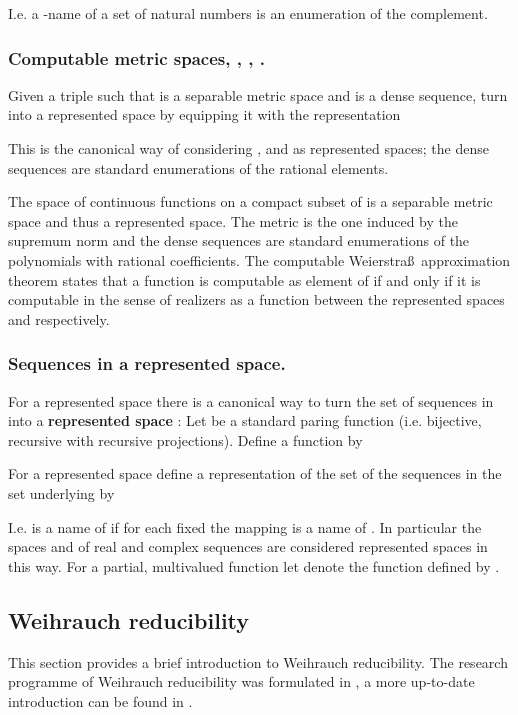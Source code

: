 \documentclass{eptcs-modified}
\newcommand{\demph}{\textbf}
\begin{document}
				I.e. a -name of a set of natural numbers is an enumeration of the complement.
		


			\subsubsection*{Computable metric spaces, , , .}
				Given a triple  such that  is a separable metric space and  is a dense sequence, turn  into a represented space by equipping it with the representation
				
				This is the canonical way of considering ,  and  as represented spaces; the dense sequences are standard enumerations of the rational elements.

				The space  of continuous functions on a compact subset  of  is a separable metric space and thus a represented space.
				The metric is the one induced by the supremum norm and the dense sequences are standard enumerations of the polynomials with rational coefficients.
				The computable Weierstra\ss\ approximation theorem states that a function is computable as element of  if and only if it is computable in the sense of realizers as a function between the represented spaces  and  respectively.

			\subsubsection*{Sequences in a represented space.}

				For a represented space  there is a canonical way to turn the set of sequences in  into a \demph{represented space }:
				Let  be a standard paring function (i.e. bijective, recursive with recursive projections).
				Define a function  by
				
				For a represented space  define a representation of the set  of the sequences in the set  underlying  by
				
				I.e.  is a name of  if for each fixed  the mapping  is a name of .
				In particular the spaces  and  of real and complex sequences are considered represented spaces in this way.
				For a partial, multivalued function  let  denote the function defined by .

		\subsection{Weihrauch reducibility}
			This section provides a brief introduction to Weihrauch reducibility.
			The research programme of Weihrauch reducibility was formulated in \cite{MR2099383}, a more up-to-date introduction can be found in \cite{MR3350999}.
\end{document}
